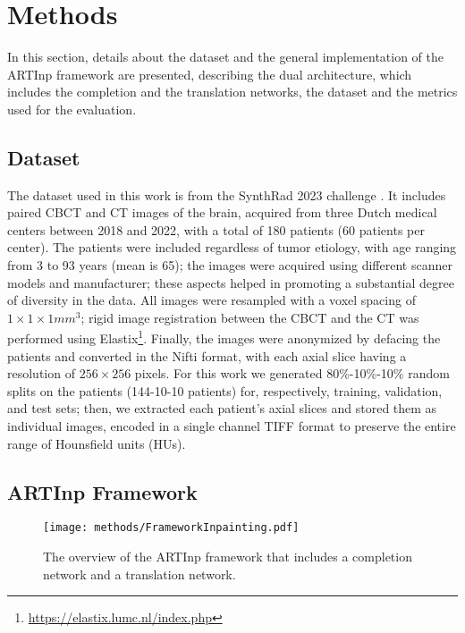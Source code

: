 \section{Methods}
\label{sec:methods}
In this section, details about the dataset and the general implementation of the ARTInp framework are presented, describing the dual architecture, which includes the completion and the translation networks, the dataset and the metrics used for the evaluation. 

\subsection{Dataset}
\label{ssec:dataset}
The dataset used in this work is from the SynthRad 2023 challenge \cite{Thummerer2023}. 
It includes paired CBCT and CT images of the brain, acquired from three Dutch medical centers between 2018 and 2022, with a total of 180 patients (60 patients per center). 
The patients were included regardless of tumor etiology, with age ranging from 3 to 93 years (mean is 65); the images were acquired using different scanner models and manufacturer; these aspects helped in promoting a substantial degree of diversity in the data.
All images were resampled with a voxel spacing of $1 \times 1 \times 1 mm^3$; rigid image registration between the CBCT and the CT was performed using Elastix\footnote{\url{https://elastix.lumc.nl/index.php}}.
Finally, the images were anonymized by defacing the patients and converted in the Nifti format, with each axial slice having a resolution of $256 \times 256$ pixels.
For this work we generated 80\%-10\%-10\% random splits on the patients (144-10-10 patients) for, respectively, training, validation, and test sets; then, we extracted each patient's axial slices and stored them as individual images, encoded in a single channel TIFF format to preserve the entire range of Hounsfield units (HUs).


\subsection{ARTInp Framework}
\label{ssec:ARTInp}
\begin{figure*}[tb]
	\centering
		\texttt{[image: methods/FrameworkInpainting.pdf]}
	\caption{The overview of the ARTInp framework that includes a completion network and a translation network.}
	\label{fig:framwork_inpainting_translation}
\end{figure*}

